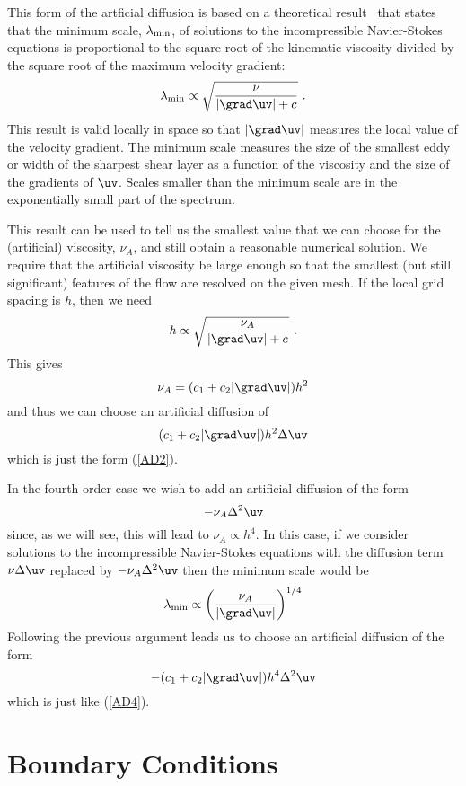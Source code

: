 \documentclass[12pt]{article}
\begin{document}
This form of the artficial diffusion is based on a theoretical
result~\cite{HKR1}\cite{HKR2} that states that the minimum scale,
$\lambda_{\rm min}$, of solutions to the incompressible Navier-Stokes
equations is proportional to the square root of the kinematic
viscosity divided by the square root of the maximum velocity gradient:
$$
   \lambda_{\rm min} \propto \sqrt{ \nu \over | \grad\uv | + c} ~.
$$
This result is valid locally in space so that $|\grad\uv|$ measures
the local value of the velocity gradient.  The minimum scale measures
the size of the smallest eddy or width of the sharpest shear layer as
a function of the viscosity and the size of the gradients of $\uv$.
Scales smaller than the minimum scale are in the exponentially small
part of the spectrum.

This result can be used to tell us the smallest value that we can
choose for the (artificial) viscosity, $\nu_A$, and still obtain a
reasonable numerical solution.  We require that the artificial
viscosity be large enough so that the smallest (but still significant)
features of the flow are resolved on the given mesh. If the local grid
spacing is $h$, then we need
$$
     h  \propto \sqrt{ \nu_A \over | \grad\uv | + c}  ~.
$$
This gives
$$
   \nu_A = (c_1 + c_2 |\grad\uv|) h^2
$$
and thus we can choose an artificial diffusion of
$$
      (c_1 + c_2 |\grad\uv|) h^2 \Delta \uv
$$
which is just the form (\ref{AD2}).

In the fourth-order case we wish to add an artificial
diffusion of the form
$$
      - \nu_A \Delta^2  \uv
$$
since, as we will see, this will lead to $\nu_A \propto h^4$.
In this case, if we consider solutions to the incompressible
Navier-Stokes equations with the diffusion term $\nu\Delta\uv$ replaced
by $ -\nu_A \Delta^2\uv$ then
the minimum scale would be
$$
  \lambda_{\rm min} \propto \left( \nu_A \over | \grad\uv | \right)^{1/4}
$$
Following the previous argument leads us to choose an artificial
diffusion of the form
$$
     -  (c_1 + c_2 |\grad\uv|) h^4 \Delta^2 \uv
$$
which is just like (\ref{AD4}).

\section{Boundary Conditions}
\end{document}
